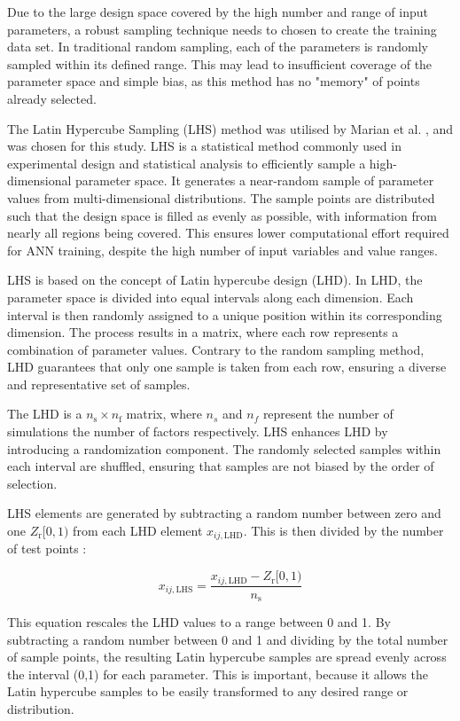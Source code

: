 Due to the large design space covered by the high number and range of input parameters, a robust sampling technique needs to chosen to create the training data set. In traditional random sampling, each of the parameters is randomly sampled within its defined range. This may lead to insufficient coverage of the parameter space and simple bias, as this method has no "memory" of points already selected.

The Latin Hypercube Sampling (LHS) method was utilised by Marian et al. \cite{Marian2022}, and was chosen for this study. LHS is a statistical method commonly used in experimental design and statistical analysis to efficiently sample a high-dimensional parameter space. It generates a near-random sample of parameter values from multi-dimensional distributions. The sample points are distributed such that the design space is filled as evenly as possible, with information from nearly all regions being covered. This ensures lower computational effort required for ANN training, despite the high number of input variables and value ranges. 

LHS is based on the concept of Latin hypercube design (LHD). In LHD, the parameter space is divided into equal intervals along each dimension. Each interval is then randomly assigned to a unique position within its corresponding dimension. The process results in a matrix, where each row represents a combination of parameter values. Contrary to the random sampling method, LHD guarantees that only one sample is taken from each row, ensuring a diverse and representative set of samples.

The LHD is a $n_{\mathrm{s}} \times n_{\mathrm{f}}$ matrix, where $n_s$ and $n_f$ represent the number of simulations the number of factors respectively. LHS enhances LHD by introducing a randomization component. The randomly selected samples within each interval are shuffled, ensuring that samples are not biased by the order of selection.

LHS elements are generated by subtracting a random number between zero and one $Z_{\mathrm{r}}[0,1)$ from each LHD element $x_{i j, \mathrm{LHD}}$. This is then divided by the number of test points \cite{Siebertz2010}:

\begin{equation}\label{LHS}
	x_{i j, \mathrm{LHS}}=\frac{x_{i j, \mathrm{LHD}}-Z_{\mathrm{r}}[0,1)}{n_{\mathrm{s}}}
\end{equation}

This equation rescales the LHD values to a range between 0 and 1. By subtracting a random number between 0 and 1 and dividing by the total number of sample points, the resulting Latin hypercube samples are spread evenly across the interval (0,1) for each parameter. This is important, because it allows the Latin hypercube samples to be easily transformed to any desired range or distribution.


